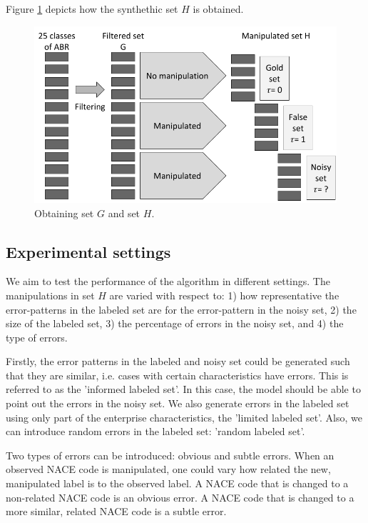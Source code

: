 \documentclass[12pt, a4paper, titlepage]{article}
\begin{document}
Figure \ref{fig1} depicts how the synthethic set $H$ is obtained.

\begin{figure}[h]
\includegraphics[width=\linewidth]{Synthethic set2}
\caption{Obtaining set $G$ and set $H$.}
\label{fig1}
\end{figure}

					\subsection{Experimental settings}
					\label{section:settings}


We aim to test the performance of the algorithm in different settings. The manipulations in set $H$ are varied with respect to: 1) how representative the error-patterns in the labeled set are for the error-pattern in the noisy set, 2) the size of the labeled set, 3) the percentage of errors in the noisy set, and 4) the type of errors. 

Firstly, the error patterns in the labeled and noisy set could be generated such that they are similar, i.e. cases with certain characteristics have errors. This is referred to as the 'informed labeled set'. In this case, the model should be able to point out the errors in the noisy set. We also generate errors in the labeled set using only part of the enterprise characteristics, the 'limited labeled set'. Also, we can introduce random errors in the labeled set: 'random labeled set'. 

Two types of errors can be introduced: obvious and subtle errors. When an observed NACE code is manipulated, one could vary how related the new, manipulated label is to the observed label. A NACE code that is changed to a non-related NACE code is an obvious error. A NACE code that is changed to a more similar, related NACE code is a subtle error.
\end{document}
